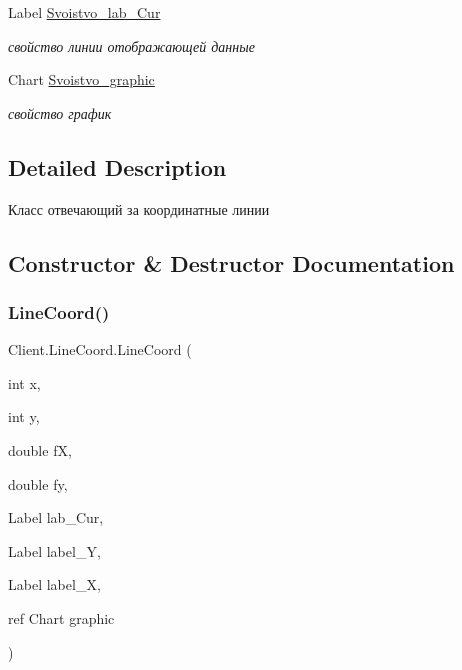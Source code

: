 \begin{DoxyCompactItemize}
Label \hyperlink{class_client_1_1_line_coord_a419f0d51c6a6ab8755f5313acf10edd7}{Svoistvo\+\_\+lab\+\_\+\+Cur}
\begin{DoxyCompactList}\small\item\em свойство линии отображающей данные \end{DoxyCompactList}\item 
Chart \hyperlink{class_client_1_1_line_coord_ade37bc49a7a9e2daaec818e4dd3a275f}{Svoistvo\+\_\+graphic}
\begin{DoxyCompactList}\small\item\em свойство график \end{DoxyCompactList}\end{DoxyCompactItemize}


\subsection{Detailed Description}
Класс отвечающий за координатные линии 



\subsection{Constructor \& Destructor Documentation}
\hypertarget{class_client_1_1_line_coord_a0cbce126477bfbcd61f7f717bdc0f5fd}{}\label{class_client_1_1_line_coord_a0cbce126477bfbcd61f7f717bdc0f5fd} 
\subsubsection{\texorpdfstring{Line\+Coord()}{LineCoord()}}
{\footnotesize\ttfamily Client.\+Line\+Coord.\+Line\+Coord (\begin{DoxyParamCaption}\item[{int}]{x,  }\item[{int}]{y,  }\item[{double}]{fX,  }\item[{double}]{fy,  }\item[{Label}]{lab\+\_\+\+Cur,  }\item[{Label}]{label\+\_\+Y,  }\item[{Label}]{label\+\_\+X,  }\item[{ref Chart}]{graphic }\end{DoxyParamCaption})\hspace{0.3cm}{\ttfamily [inline]}}



